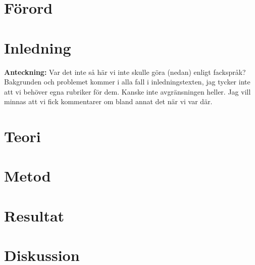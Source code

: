 \documentclass[a4wide,twoside]{article}
\newcommand{\notes}[1]{{\color{BrickRed}\textbf{Anteckning: }\color{Red}#1}}
\begin{document}


\pagestyle{plain}
\section*{Förord}

\cleardoublepage
\tableofcontents
\cleardoublepage
\pagestyle{fancier}

\section{Inledning}

\notes{Var det inte så här vi inte skulle göra (nedan) enligt
fackspråk? Bakgrunden och
problemet kommer i alla fall i inledningstexten, jag tycker inte att
vi behöver egna rubriker för dem. Kanske inte avgränsningen heller.
Jag vill minnas att vi fick kommentarer om bland annat det när vi var
där.}




\cleardoublepage

\section{Teori}




\cleardoublepage

\section{Metod}
%

\cleardoublepage

\section{Resultat}




\cleardoublepage

\section{Diskussion}
%
%
%

\cleardoublepage

\pagestyle{plain}


\newpage

\appendix
\end{document}
